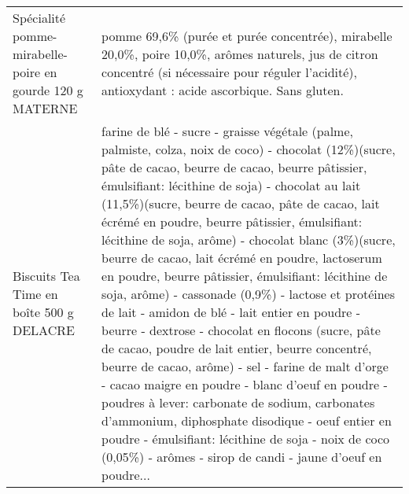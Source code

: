 \begin{longtable}{p{5cm}p{10cm}}
                                                 Spécialité pomme-mirabelle-poire en gourde 120 g MATERNE &                                                                                                                                                                                                                                                                                                                                                                                                                                                                                                                                                                                                                                                                                                                                                                                                                                     pomme 69,6\% (purée et purée concentrée), mirabelle 20,0\%, poire 10,0\%, arômes naturels, jus de citron concentré (si nécessaire pour réguler l'acidité), antioxydant : acide ascorbique. Sans gluten. \\
                                                                 Biscuits Tea Time en boîte 500 g DELACRE &  farine de blé - sucre - graisse végétale (palme, palmiste, colza, noix de coco) - chocolat (12\%)(sucre, pâte de cacao, beurre de cacao, beurre pâtissier, émulsifiant: lécithine de soja) - chocolat au lait (11,5\%)(sucre, beurre de cacao, pâte de cacao, lait écrémé en poudre, beurre pâtissier, émulsifiant: lécithine de soja, arôme) - chocolat blanc (3\%)(sucre, beurre de cacao, lait écrémé en poudre, lactoserum en poudre, beurre pâtissier, émulsifiant: lécithine de soja, arôme) - cassonade (0,9\%) - lactose et protéines de lait - amidon de blé - lait entier en poudre - beurre - dextrose -  chocolat en flocons (sucre, pâte de cacao, poudre de lait entier, beurre concentré, beurre de cacao, arôme) - sel - farine de malt d'orge - cacao maigre en poudre - blanc d'oeuf en poudre - poudres à lever: carbonate de sodium, carbonates d'ammonium, diphosphate disodique - oeuf entier en poudre - émulsifiant: lécithine de soja - noix de coco (0,05\%) - arômes - sirop de candi - jaune d'oeuf en poudre... \\

\end{longtable}
